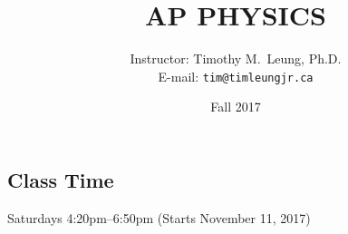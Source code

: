 \documentclass[11pt,letterpaper]{article}
\title{\vspace{-0.2in}\textbf{AP PHYSICS}}
\author{Instructor: Timothy M.\ Leung, Ph.D.\\
  E-mail: \texttt{tim@timleungjr.ca}}
\date{Fall 2017}
\begin{document}
\maketitle

\subsection*{Class Time}
Saturdays 4:20pm--6:50pm (Starts November 11, 2017)


%
\end{document}
